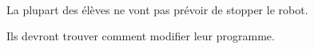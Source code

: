 \begin{minipage}[t]{0.5\linewidth}
    \begin{methode}~\\
        La plupart des élèves ne vont pas prévoir de stopper le robot.
        
        
        Ils devront trouver comment modifier leur programme.
        
        
        
    \end{methode}
\end{minipage}
\hfill
